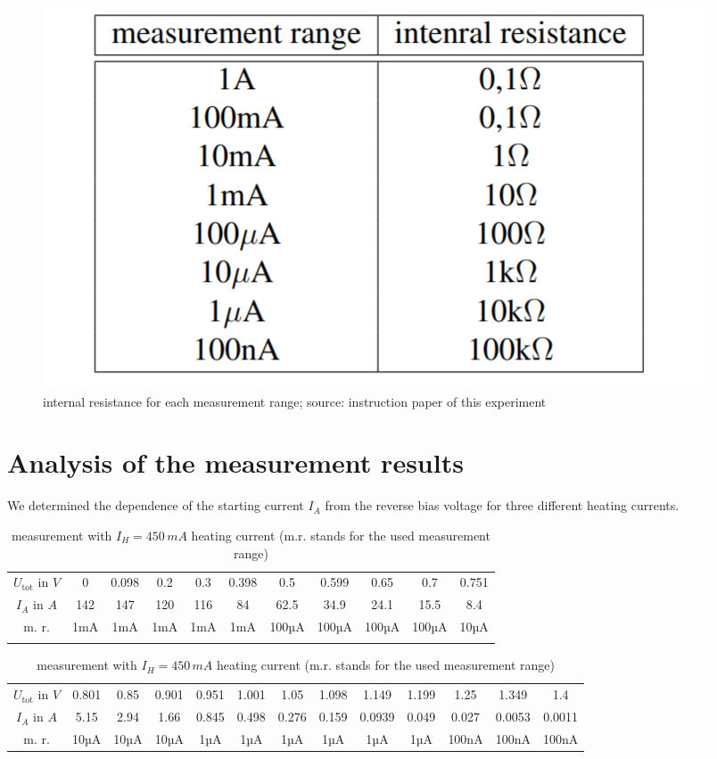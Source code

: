 \documentclass[a4paper, 12pt]{scrartcl}
\begin{document}
\begin{figure}[H]\includegraphics[scale=1]{TEpic2}\caption{internal resistance for each measurement range; source: instruction paper of this experiment}\end{figure}

\newpage
\section{Analysis of the measurement results}

We determined the dependence of the starting current $I_A$ from the reverse bias voltage for three different heating currents.
\begin{table}[H]\begin{tabular}{ccccccccccc}
$U_\text{tot}$ in $V$&0&0.098&0.2&0.3&0.398&0.5&
0.599&
0.65&
0.7&
0.751\\
$I_A$ in $A$&142&
147&
120&
116&
84&
62.5&
34.9&
24.1&
15.5&
8.4\\m. r.&1mA&
1mA&
1mA&
1mA&
1mA&
100µA&
100µA&
100µA&
100µA&
10µA\\&&&&&&&&&&\end{tabular}\newline
\hspace*{-2cm}\begin{tabular}{ccccccccccccc}
$U_\text{tot}$ in $V$&0.801&
0.85&
0.901&
0.951&
1.001&
1.05&
1.098&
1.149&
1.199&
1.25&
1.349&
1.4\\
$I_A$ in $A$&5.15&
2.94&
1.66&
0.845&
0.498&
0.276&
0.159&
0.0939&
0.049&
0.027&
0.0053&
0.0011\\
m. r.&10µA&
10µA&
10µA&
1µA&
1µA&
1µA&
1µA&
1µA&
1µA&
100nA&
100nA&
100nA\end{tabular}\caption{measurement with $I_H=450\,mA$ heating current (m.r. stands for the used measurement range)}\end{table}
\end{document}
